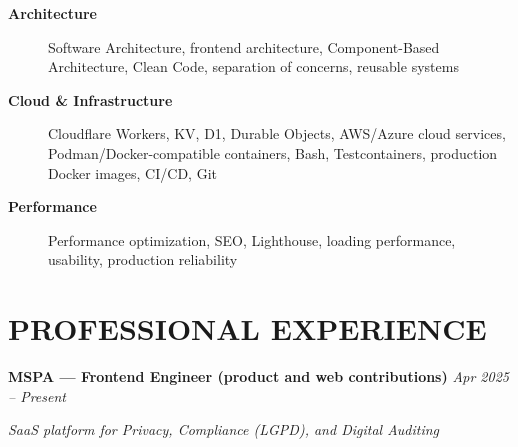 \documentclass[10pt,a4paper]{article}
\begin{document}
\begin{description}
    \item[\textbf{Architecture}]
    Software Architecture, frontend architecture,
    Component-Based Architecture, Clean Code,
    separation of concerns, reusable systems

    \item[\textbf{Cloud \& Infrastructure}]
    Cloudflare Workers, KV, D1, Durable Objects,
    AWS/Azure cloud services, Podman/Docker-compatible containers,
    Bash, Testcontainers, production Docker images, CI/CD, Git

    \item[\textbf{Performance}]
    Performance optimization, SEO, Lighthouse,
    loading performance, usability, production reliability

\end{description}


\section*{PROFESSIONAL EXPERIENCE}

\noindent
\textbf{MSPA — Frontend Engineer (product and web contributions)}
\hfill
\textit{Apr 2025 -- Present}

\textit{SaaS platform for Privacy, Compliance (LGPD), and Digital Auditing}
\end{document}
